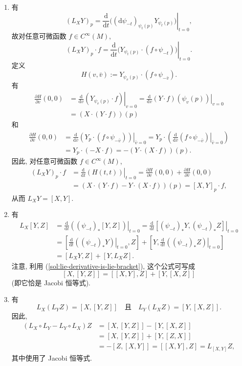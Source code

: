 \begin{description}[font=\normalfont,leftmargin=2em,labelwidth=1.5em]
\begin{enumerate}[label=(\alph*),ref=\alph*,leftmargin=*]
\item\label{sol:lie-derivative-is-lie-bracket} 有
\[
  (L_XY)_p=\left.\frac{\mathrm{d}}{\mathrm{d}t}\bigl((\mathrm{d}\psi_{-t})_{\psi_t(p)}Y_{\psi_t(p)}\bigr)\right|_{t=0},
\]
故对任意可微函数 $f\in C^\infty(M)$,
\[
  (L_XY)_p\cdot f=\left.\frac{\mathrm{d}}{\mathrm{d}t}\bigl(Y_{\psi_t(p)}\cdot(f\circ\psi_{-t})\bigr)\right|_{t=0}.
\]
定义
\[
  H(v,\bar v):=Y_{\psi_v(p)}\cdot(f\circ\psi_{-\bar v}).
\]
有
\begin{align*}
  \frac{\partial H}{\partial v}(0,0)
  &=\left.\frac{\mathrm{d}}{\mathrm{d}v}(Y_{\psi_v(p)}\cdot f)\right|_{v=0}
  =\left.\frac{\mathrm{d}}{\mathrm{d}v}(Y\cdot f)(\psi_v(p))\right|_{v=0}\\
  &=(X\cdot(Y\cdot f))(p)
\end{align*}
和
\begin{align*}
  \frac{\partial H}{\partial\bar v}(0,0)
  &=\left.\frac{\mathrm{d}}{\mathrm{d}\bar v}(Y_p\cdot(f\circ\psi_{-\bar v}))\right|_{\bar v=0}
  =Y_p\cdot\left(\left.\frac{\mathrm{d}}{\mathrm{d}\bar v}(f\circ\psi_{-\bar v})\right|_{\bar v=0}\right)\\
  &=Y_p\cdot(-X\cdot f)=-(Y\cdot(X\cdot f))(p).
\end{align*}
因此, 对任意可微函数 $f\in C^\infty(M)$,
\begin{align*}
  (L_XY)_p\cdot f&=\left.\frac{\mathrm{d}}{\mathrm{d}t}(H(t,t))\right|_{t=0}
  =\frac{\partial H}{\partial v}(0,0)+\frac{\partial H}{\partial\bar v}(0,0)\\
  &=(X\cdot(Y\cdot f)-Y\cdot(X\cdot f))(p)=[X,Y]_p\cdot f,
\end{align*}
从而 $L_XY=[X,Y]$.
\item 有
\begin{align*}
  L_X[Y,Z]
  &=\left.\frac{\mathrm{d}}{\mathrm{d}t}((\psi_{-t})_*[Y,Z])\right|_{t=0}
  =\left.\frac{\mathrm{d}}{\mathrm{d}t}[(\psi_{-t})_*Y,(\psi_{-t})_*Z]\right|_{t=0}\\
  &=\left[\left.\frac{\mathrm{d}}{\mathrm{d}t}((\psi_{-t})_*Y)\right|_{t=0},Z\right]
   +\left[Y,\left.\frac{\mathrm{d}}{\mathrm{d}t}((\psi_{-t})_*Z)\right|_{t=0}\right]\\
  &=[L_XY,Z]+[Y,L_XZ].
\end{align*}
注意, 利用 (\ref{sol:lie-derivative-is-lie-bracket}), 这个公式可写成
\[
  [X,[Y,Z]]=[[X,Y],Z]+[Y,[X,Z]]
\]
(即它恰是 Jacobi 恒等式).
\item 有
\[
  L_X(L_YZ)=[X,[Y,Z]]
  \quad\text{且}\quad L_Y(L_XZ)=[Y,[X,Z]].
\]
因此,
\begin{align*}
  (L_X\circ L_Y-L_Y\circ L_X)Z
  &=[X,[Y,Z]]-[Y,[X,Z]]\\
  &=[X,[Y,Z]]+[Y,[Z,X]]\\
  &=-[Z,[X,Y]]=[[X,Y],Z]=L_{[X,Y]}Z,
\end{align*}
其中使用了 Jacobi 恒等式.
\end{enumerate}


\end{description}
